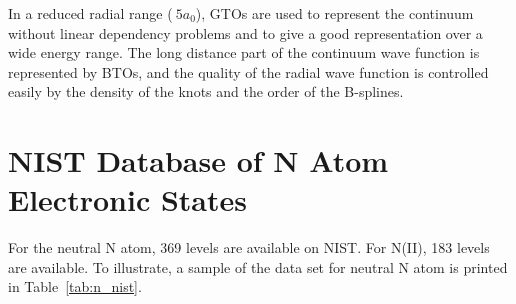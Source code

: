 \documentclass[12pt]{article}
\begin{document}
In a reduced radial range ($~5 a_0$),
GTOs are used to represent the continuum without linear
dependency problems and to give a good representation over
a wide energy range. The long distance part of the continuum
wave function is represented by BTOs, and the quality of the radial
wave function is controlled easily by the density of the knots
and the order of the B-splines. 

\section{NIST Database of N Atom Electronic States}

For the neutral N atom, 369 levels are available on NIST.\cite{NIST_ASD}
For N(II), 183 levels are available. 
To illustrate, a sample of the data set for neutral N atom is printed in Table~\ref{tab:n_nist}.
\end{document}
